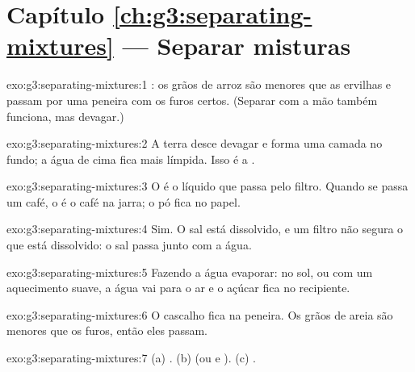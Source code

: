 \section*{Capítulo \ref{ch:g3:separating-mixtures} --- Separar misturas}

\begin{solution}{exo:g3:separating-mixtures:1}
: os grãos de arroz são menores que as ervilhas e passam por
uma peneira com os furos certos. (Separar com a mão também funciona,
mas devagar.)
\end{solution}

\begin{solution}{exo:g3:separating-mixtures:2}
A terra desce devagar e forma uma camada no fundo; a água de cima fica
mais límpida. Isso é a .
\end{solution}

\begin{solution}{exo:g3:separating-mixtures:3}
O  é o líquido que passa pelo filtro. Quando se passa um café, o
 é o café na jarra; o pó fica no papel.
\end{solution}

\begin{solution}{exo:g3:separating-mixtures:4}
Sim. O sal está dissolvido, e um filtro não segura o que está
dissolvido: o sal passa junto com a água.
\end{solution}

\begin{solution}{exo:g3:separating-mixtures:5}
Fazendo a água evaporar: no sol, ou com um aquecimento suave, a água vai
para o ar e o açúcar fica no recipiente.
\end{solution}

\begin{solution}{exo:g3:separating-mixtures:6}
O cascalho fica na peneira. Os grãos de areia são menores que os furos,
então eles passam.
\end{solution}

\begin{solution}{exo:g3:separating-mixtures:7}
(a) . (b)  (ou  e ). (c) .
\end{solution}

